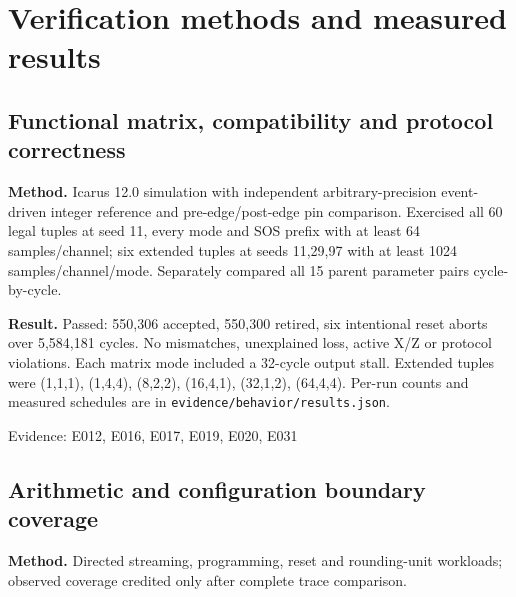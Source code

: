 \documentclass[11pt,a4paper]{article}
\begin{document}
\section{Verification methods and measured results}

\subsection{Functional matrix,\allowbreak{} compatibility and protocol correctness}

\textbf{Method.} Icarus 12.0 simulation with independent arbitrary-precision event-driven integer reference and pre-edge/\allowbreak{}post-edge pin comparison. Exercised all 60 legal tuples at seed 11,\allowbreak{} every mode and SOS prefix with at least 64 samples/\allowbreak{}channel; six extended tuples at seeds 11,\allowbreak{}29,\allowbreak{}97 with at least 1024 samples/\allowbreak{}channel/\allowbreak{}mode. Separately compared all 15 parent parameter pairs cycle-by-cycle.

\textbf{Result.} Passed: 550,\allowbreak{}306 accepted,\allowbreak{} 550,\allowbreak{}300 retired,\allowbreak{} six intentional reset aborts over 5,\allowbreak{}584,\allowbreak{}181 cycles. No mismatches,\allowbreak{} unexplained loss,\allowbreak{} active X/\allowbreak{}Z or protocol violations. Each matrix mode included a 32-cycle output stall. Extended tuples were (\allowbreak{}1,\allowbreak{}1,\allowbreak{}1)\allowbreak{},\allowbreak{} (\allowbreak{}1,\allowbreak{}4,\allowbreak{}4)\allowbreak{},\allowbreak{} (\allowbreak{}8,\allowbreak{}2,\allowbreak{}2)\allowbreak{},\allowbreak{} (\allowbreak{}16,\allowbreak{}4,\allowbreak{}1)\allowbreak{},\allowbreak{} (\allowbreak{}32,\allowbreak{}1,\allowbreak{}2)\allowbreak{},\allowbreak{} (\allowbreak{}64,\allowbreak{}4,\allowbreak{}4)\allowbreak{}. Per-run counts and measured schedules are in \texttt{evidence/\allowbreak{}behavior/\allowbreak{}results.json}.

{\small Evidence: E012,\allowbreak{} E016,\allowbreak{} E017,\allowbreak{} E019,\allowbreak{} E020,\allowbreak{} E031}

\subsection{Arithmetic and configuration boundary coverage}

\textbf{Method.} Directed streaming,\allowbreak{} programming,\allowbreak{} reset and rounding-unit workloads; observed coverage credited only after complete trace comparison.
\end{document}
